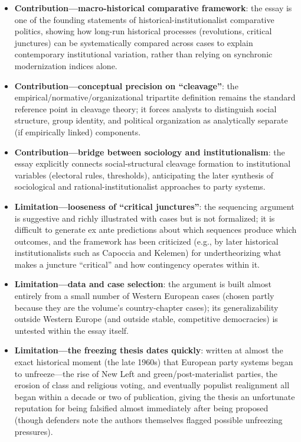 \documentclass[12pt]{article}
\begin{document}
\begin{itemize}[leftmargin=*, itemsep=4pt]
    \item \textbf{Contribution---macro-historical comparative framework}: the essay is one of the founding statements of historical-institutionalist comparative politics, showing how long-run historical processes (revolutions, critical junctures) can be systematically compared across cases to explain contemporary institutional variation, rather than relying on synchronic modernization indices alone.
    \item \textbf{Contribution---conceptual precision on ``cleavage''}: the empirical/normative/organizational tripartite definition remains the standard reference point in cleavage theory; it forces analysts to distinguish social structure, group identity, and political organization as analytically separate (if empirically linked) components.
    \item \textbf{Contribution---bridge between sociology and institutionalism}: the essay explicitly connects social-structural cleavage formation to institutional variables (electoral rules, thresholds), anticipating the later synthesis of sociological and rational-institutionalist approaches to party systems.
    \item \textbf{Limitation---looseness of ``critical junctures''}: the sequencing argument is suggestive and richly illustrated with cases but is not formalized; it is difficult to generate ex ante predictions about which sequences produce which outcomes, and the framework has been criticized (e.g., by later historical institutionalists such as Capoccia and Kelemen) for undertheorizing what makes a juncture ``critical'' and how contingency operates within it.
    \item \textbf{Limitation---data and case selection}: the argument is built almost entirely from a small number of Western European cases (chosen partly because they are the volume's country-chapter cases); its generalizability outside Western Europe (and outside stable, competitive democracies) is untested within the essay itself.
    \item \textbf{Limitation---the freezing thesis dates quickly}: written at almost the exact historical moment (the late 1960s) that European party systems began to unfreeze---the rise of New Left and green/post-materialist parties, the erosion of class and religious voting, and eventually populist realignment all began within a decade or two of publication, giving the thesis an unfortunate reputation for being falsified almost immediately after being proposed (though defenders note the authors themselves flagged possible unfreezing pressures).
\end{itemize}
\end{document}

